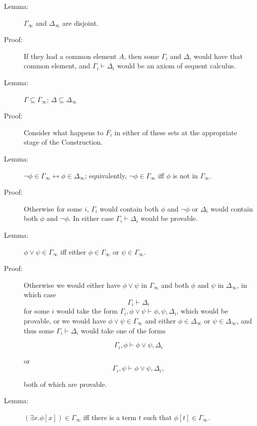 \documentclass[12pt]{book}
\begin{document}
\begin{description}

\item[Lemma:]  $\Gamma_{\infty}$ and $\Delta_{\infty}$ are disjoint.

\item[Proof:] If they had a common element $A$, then some $\Gamma_i$
and $\Delta_i$ would have that common element, and
$\Gamma_i\vdash\Delta_i$ would be an axiom of sequent calculus.

\item [Lemma:]  $\Gamma \subseteq \Gamma_{\infty}$; $\Delta \subseteq \Delta_{\infty}$

\item[Proof:]  Consider what happens to $F_i$ in either of these sets
at the appropriate stage of the Construction.

\item[Lemma:] $\neg\phi \in \Gamma_{\infty} \leftrightarrow \phi \in
\Delta_{\infty}$; equivalently, $\neg\phi\in \Gamma_{\infty}$ iff $\phi$
is not in $\Gamma_{\infty}$.

\item[Proof:]  Otherwise for some $i$, $\Gamma_{i}$ would contain both
$\phi$ and $\neg\phi$ or $\Delta_i$ would contain both $\phi$ and
$\neg\phi$.  In either case $\Gamma_i \vdash \Delta_i$ would be provable.

\item[Lemma:] $\phi \vee \psi \in \Gamma_{\infty}$ iff either $\phi
\in \Gamma_{\infty}$ or $\psi \in \Gamma_{\infty}$.

\item[Proof:] Otherwise we would either have $\phi \vee \psi$ in
$\Gamma_{\infty}$ and both $\phi$ and $\psi$ in $\Delta_{\infty}$, in
which case $$\Gamma_i \vdash \Delta_i$$ for some $i$ would take the
form $\Gamma_i,\phi\vee\psi \vdash \phi,\psi,\Delta_i$, which would be
provable, or we would have $\phi\vee\psi \in \Gamma_{\infty}$ and
either $\phi \in \Delta_{\infty}$ or $\psi \in \Delta_{\infty}$,
and thus some $\Gamma_i \vdash \Delta_i$ would take one of the forms

$$\Gamma_i,\phi\vdash \phi\vee\psi,\Delta_i$$

or 
$$\Gamma_i,\psi\vdash \phi\vee\psi,\Delta_i,$$

both of which are provable.

\item[Lemma:]  $(\exists x.\phi[x]) \in \Gamma_{\infty}$ iff
there is a term $t$ such that $\phi[t] \in \Gamma_{\infty}$.


\end{description}
\end{document}
